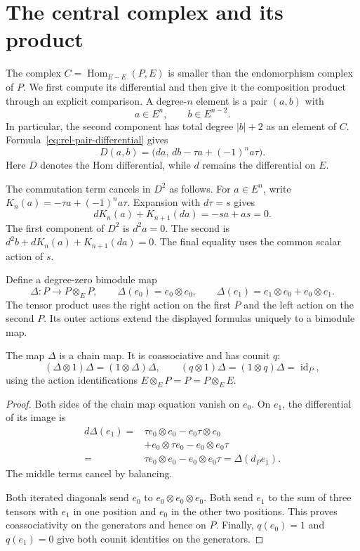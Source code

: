 \section{The central complex and its product}
\label{sec:rel-central-complex}

The complex $C=\operatorname{Hom}_{E-E}(P,E)$ is smaller than the
endomorphism complex of $P$. We first compute its differential and then
give it the composition product through an explicit comparison.
A degree-$n$ element is a pair $(a,b)$ with
\[
 a\in E^n,\qquad b\in E^{n-2}.
\]
In particular, the second component has total degree $|b|+2$ as an
element of $C$. Formula~\eqref{eq:rel-pair-differential} gives
\begin{equation}\label{eq:rel-central-pair}
 D(a,b)=\bigl(da,\,db-\tau a+(-1)^n a\tau\bigr).
\end{equation}
Here $D$ denotes the Hom differential, while $d$ remains the differential
on $E$.

The commutation term cancels in $D^2$ as follows.
For $a\in E^n$, write $K_n(a)=-\tau a+(-1)^n a\tau$.
Expansion with $d\tau=s$ gives
\[
 dK_n(a)+K_{n+1}(da)=-sa+as=0.
\]
The first component of $D^2$ is $d^2a=0$.
The second is $d^2b+dK_n(a)+K_{n+1}(da)=0$.
The final equality uses the common scalar action of $s$.

Define a degree-zero bimodule map
\[
 \Delta:P\longrightarrow P\otimes_E P,
 \qquad
 \Delta(e_0)=e_0\otimes e_0,
 \qquad
 \Delta(e_1)=e_1\otimes e_0+e_0\otimes e_1.
\]
The tensor product uses the right action on the first $P$ and the left
action on the second $P$. Its outer actions extend the displayed formulas
uniquely to a bimodule map.

\begin{lemma}\label{lem:rel-diagonal}
The map $\Delta$ is a chain map. It is coassociative and has counit $q$:
\[
 (\Delta\otimes1)\Delta=(1\otimes\Delta)\Delta,
 \qquad (q\otimes1)\Delta=(1\otimes q)\Delta=\operatorname{id}_P,
\]
using the action identifications $E\otimes_E P=P=P\otimes_E E$.
\end{lemma}

\begin{proof}
Both sides of the chain map equation vanish on $e_0$.
On $e_1$, the differential of its image is
\[
 \begin{split}
 d\Delta(e_1)
  ={}&\tau e_0\otimes e_0-e_0\tau\otimes e_0\\
    &+e_0\otimes\tau e_0-e_0\otimes e_0\tau\\
  ={}&\tau e_0\otimes e_0-e_0\otimes e_0\tau
   =\Delta(d_Pe_1).
 \end{split}
\]
The middle terms cancel by balancing.

Both iterated diagonals send $e_0$ to $e_0\otimes e_0\otimes e_0$.
Both send $e_1$ to the sum of three tensors with $e_1$ in one position
and $e_0$ in the other two positions.
This proves coassociativity on the generators and hence on $P$.
Finally, $q(e_0)=1$ and $q(e_1)=0$ give both counit identities on the
generators.
\end{proof}

